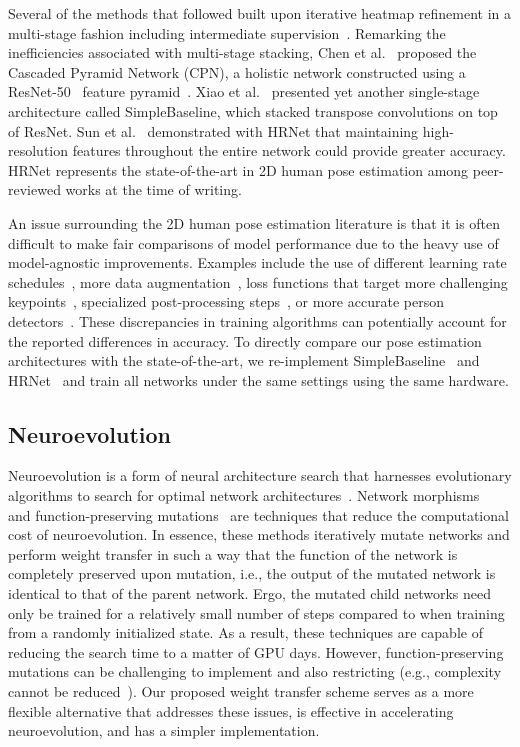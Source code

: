 \documentclass{ieeeaccess}
\begin{document}
Several of the methods that followed built upon iterative heatmap refinement in a multi-stage fashion including intermediate supervision~\cite{wei2016convolutional, cao2017realtime, newell2016stacked}. Remarking the inefficiencies associated with multi-stage stacking, Chen et al.~\cite{chen2018cascaded} proposed the Cascaded Pyramid Network (CPN), a holistic network constructed using a ResNet-50~\cite{he2016deep} feature pyramid~\cite{lin2017feature}. Xiao et al.\ \cite{xiao2018simple} presented yet another single-stage architecture called SimpleBaseline, which stacked transpose convolutions on top of ResNet. Sun et al.\ \cite{sun2019deep} demonstrated with HRNet that maintaining high-resolution features throughout the entire network could provide greater accuracy. HRNet represents the state-of-the-art in 2D human pose estimation among peer-reviewed works at the time of writing. 



An issue surrounding the 2D human pose estimation literature is that it is often difficult to make fair comparisons of model performance due to the heavy use of model-agnostic improvements. Examples include the use of different learning rate schedules~\cite{sun2019deep, li2019rethinking}, more data augmentation~\cite{li2019rethinking, bin2020adversarial}, loss functions that target more challenging keypoints~\cite{chen2018cascaded}, specialized post-processing steps~\cite{moon2019posefix, huang2020devil}, or more accurate person detectors~\cite{li2019rethinking, huang2020devil}. These discrepancies in training algorithms can potentially account for the reported differences in accuracy. To directly compare our pose estimation architectures with the state-of-the-art, we re-implement SimpleBaseline~\cite{xiao2018simple} and HRNet~\cite{sun2019deep} and train all networks under the same settings using the same hardware.


\subsection{Neuroevolution}
Neuroevolution is a form of neural architecture search that harnesses evolutionary algorithms to search for optimal network architectures~\cite{real2017large, stanley2019designing}. Network morphisms~\cite{wei2016network} and function-preserving mutations~\cite{wistuba2018deep} are techniques that reduce the computational cost of neuroevolution. In essence, these methods iteratively mutate networks and perform weight transfer in such a way that the function of the network is completely preserved upon mutation, i.e., the output of the mutated network is identical to that of the parent network. Ergo, the mutated child networks need only be trained for a relatively small number of steps compared to when training from a randomly initialized state. As a result, these techniques are capable of reducing the search time to a matter of GPU days. However, function-preserving mutations can be challenging to implement and also restricting (e.g., complexity cannot be reduced~\cite{wistuba2018deep}). Our proposed weight transfer scheme serves as a more flexible alternative that addresses these issues, is effective in accelerating neuroevolution, and has a simpler implementation.
\end{document}
